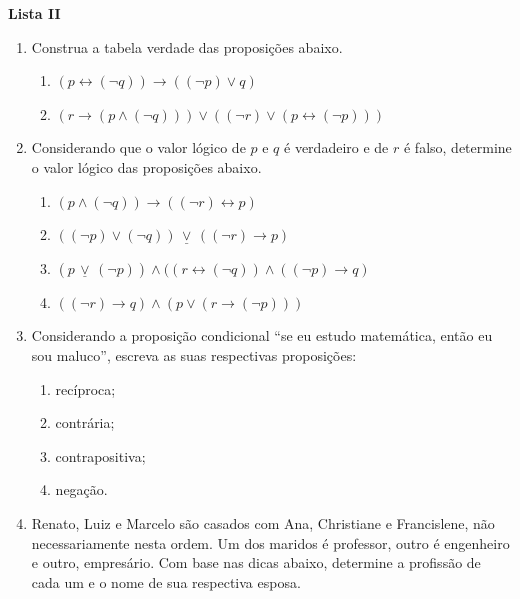 \documentclass[12pt,a4paper]{article}
\begin{document}
\begin{center}
  \textbf{Lista II}
\end{center}

\begin{enumerate}
  \item Construa a tabela verdade das proposições abaixo.
 
    \begin{enumerate}
      \item $(p \leftrightarrow (\lnot q))\rightarrow((\lnot p) \vee q)$
      \item $(r \rightarrow (p \wedge (\lnot q)))\vee ((\lnot r) \vee (p \leftrightarrow (\lnot p)))$
    \end{enumerate}

  \item Considerando que o valor lógico de $p$ e $q$ é verdadeiro e de $r$ é falso, determine o 
    valor lógico das proposições abaixo.

    \begin{enumerate}
      \item $(p \wedge (\lnot q))\rightarrow ((\lnot r) \leftrightarrow p)$
      \item $((\lnot p) \vee (\lnot q)) \,\underline{\vee}\, ((\lnot r)\rightarrow p)$
      \item $(p \,\underline{\vee}\, (\lnot p))\wedge ((r \leftrightarrow (\lnot q))\wedge ((\lnot p)\rightarrow q)$
      \item $((\lnot r)\rightarrow q) \wedge (p \vee (r \rightarrow (\lnot p)))$
    \end{enumerate}

  \item Considerando a proposição condicional ``se eu estudo matemática, então eu sou maluco'', escreva 
  as suas respectivas proposições:

    \begin{enumerate}
      \item recíproca;
      \item contrária;
      \item contrapositiva;
      \item negação.
    \end{enumerate}

  \item Renato, Luiz e Marcelo são casados com Ana, Christiane e Francislene, não necessariamente nesta ordem. 
    Um dos maridos é professor, outro é engenheiro e outro, empresário. Com base nas dicas abaixo, determine 
    a profissão de cada um e o nome de sua respectiva esposa.
    

\end{enumerate}
\end{document}
